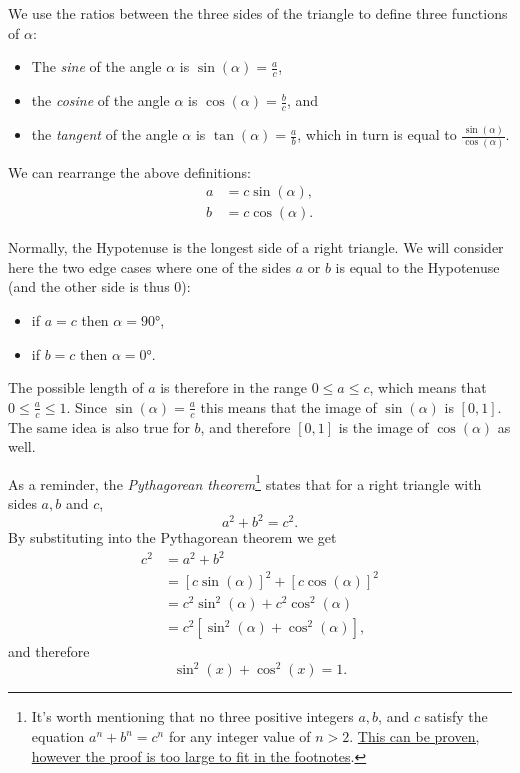 We use the ratios between the three sides of the triangle to define three functions of $\alpha$:
\vspace{5mm}
\begin{itemize}
	\item The \emph{sine} of the angle $\alpha$ is $\sin(\alpha)=\frac{a}{c}$,
	\item the \emph{cosine} of the angle $\alpha$ is $\cos(\alpha)=\frac{b}{c}$, and
	\item the \emph{tangent} of the angle $\alpha$ is $\tan(\alpha)=\frac{a}{b}$, which in turn is equal to $\frac{\sin(\alpha)}{\cos(\alpha)}$.
\end{itemize}

We can rearrange the above definitions:
\begin{align}
	a &= c\sin(\alpha),\nonumber\\
	b &= c\cos(\alpha).
	\label{eq:basic_trig_rearrange}
\end{align}

Normally, the Hypotenuse is the longest side of a right triangle. We will consider here the two edge cases where one of the sides $a$ or $b$ is equal to the Hypotenuse (and the other side is thus $0$):
\begin{itemize}
	\item if $a=c$ then $\alpha=\ang{90}$,\
	\item if $b=c$ then $\alpha=\ang{0}$.
\end{itemize}

The possible length of $a$ is therefore in the range $0\leq a \leq c$, which means that $0\leq \frac{a}{c} \leq 1$. Since $\sin(\alpha)=\frac{a}{c}$ this means that the image of $\sin(\alpha)$ is $[0,1]$. The same idea is also true for $b$, and therefore $[0,1]$ is the image of $\cos(\alpha)$ as well.

As a reminder, the \emph{Pythagorean theorem}\footnote{It's worth mentioning that no three positive integers $a, b$, and $c$ satisfy the equation $a^{n}+b^{n}=c^{n}$ for any integer value of $n>2$. \href{https://en.wikipedia.org/wiki/Fermat\%27s_Last_Theorem}{This can be proven, however the proof is too large to fit in the footnotes}.} states that for a right triangle with sides $a, b$ and $c$,
\begin{equation}
	a^{2} + b^{2} = c^{2}.
	\label{eq:pythagorean_theorem}
\end{equation}
By substituting  into the Pythagorean theorem we get
\begin{align*}
	c^{2} &= a^{2}+b^{2}\\
	&= \left[ c\sin(\alpha) \right]^{2} + \left[ c\cos(\alpha) \right]^{2}\\
	&= c^{2}\sin^{2}(\alpha) + c^{2}\cos^{2}(\alpha)\\
	&= c^{2}\left[ \sin^{2}(\alpha) + \cos^{2}(\alpha) \right],
\end{align*}
and therefore
\begin{equation}
	\sin^{2}(x) + \cos^{2}(x) = 1.
	\label{eq:sin sqr plus cos sqr equals 1}
\end{equation}

